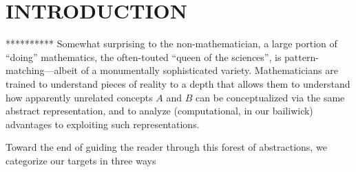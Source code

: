 
\chapter{INTRODUCTION}
\label{ch:intro}


**********
Somewhat surprising to the non-mathematician, a large portion of
``doing'' mathematics, the often-touted ``queen of the sciences'', is
pattern-matching---albeit of a monumentally sophisticated variety.
Mathematicians are trained to understand pieces of reality to a depth
that allows them to understand how apparently unrelated concepts $A$
and $B$ can be conceptualized via the same abstract representation,
and to analyze (computational, in our bailiwick) advantages to
exploiting such representations.

Toward the end of guiding the reader through this forest of
abstractions, we categorize our targets in three ways
